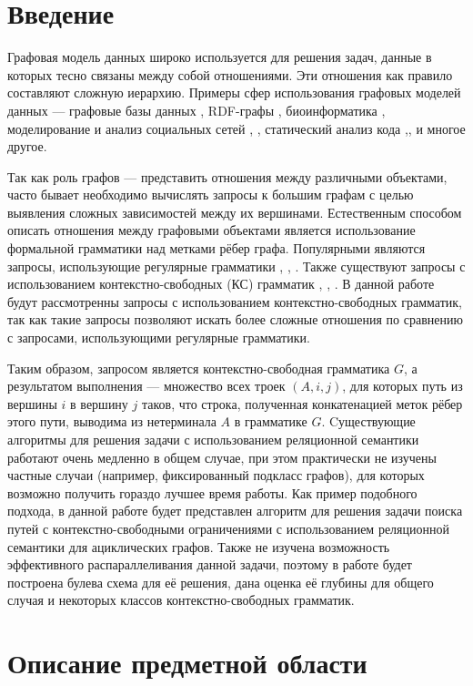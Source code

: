 \section*{Введение}
Графовая модель данных широко используется для решения
задач, данные в которых тесно связаны между собой
отношениями. Эти отношения как правило составляют сложную
иерархию. Примеры сфер использования графовых моделей
данных --- графовые базы данных \cite{GraphDB}, RDF-графы \cite{RDF}, биоинформатика \cite{Bio},
моделирование и анализ социальных сетей \cite{Warcha2012UsingNG}, \cite{social}, статический
анализ кода \cite{Static},\cite{Reps},\cite{DyckTrees} и многое другое. \par
Так как роль графов ---
представить отношения между различными объектами,
часто бывает необходимо вычислять запросы к большим графам с целью
выявления сложных зависимостей между их вершинами. Естественным способом описать отношения
между графовыми объектами является использование
формальной грамматики над метками рёбер графа. Популярными являются запросы, использующие регулярные грамматики \cite{Reg1}, \cite{Reg2}, \cite{Reg3}. Также существуют запросы с использованием
контекстно-свободных (КС) грамматик \cite{HellConj}, \cite{HellingsCFPQ}, \cite{MatrixMult}. В данной работе будут рассмотренны запросы с использованием контекстно-свободных грамматик, так как такие запросы позволяют искать более сложные отношения по сравнению с запросами, использующими регулярные грамматики. \par
 Таким образом, запросом является контекстно-свободная грамматика $G$, а результатом выполнения --- множество всех троек
$(A, i, j)$, для которых путь из вершины $i$ в вершину $j$ таков, что строка, полученная конкатенацией меток рёбер этого пути, выводима из нетерминала $A$ в грамматике $G$. Cуществующие алгоритмы для решения задачи с использованием реляционной семантики работают очень  медленно в общем случае, при этом практически не изучены частные случаи (например, фиксированный подкласс графов),  для которых возможно получить гораздо лучшее время работы. Как пример подобного подхода, в данной работе будет представлен алгоритм для решения задачи поиска путей с контекстно-свободными ограничениями с использованием реляционной семантики для ациклических графов. Также не изучена возможность эффективного распараллеливания данной задачи, поэтому в работе будет построена булева схема для её решения, дана оценка её глубины для общего случая и некоторых классов контекстно-свободных грамматик.


\section{Описание предметной области}
